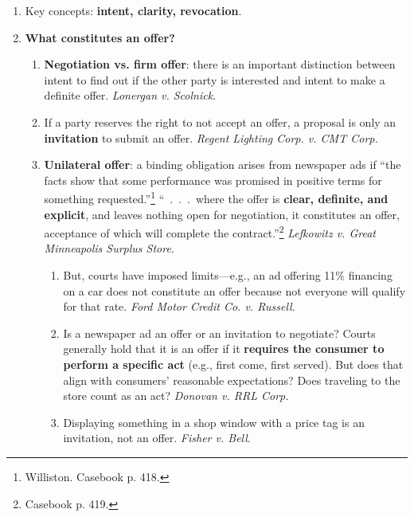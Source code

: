 \begin{enumerate}
    \item Key concepts: \textbf{intent, clarity, revocation}.
    \item \textbf{What constitutes an offer?}
    \begin{enumerate}
        \item \textbf{Negotiation vs. firm offer}: there is an important 
        distinction between intent to find out if the other party is 
        interested and intent to make a definite offer. \emph{Lonergan v. 
        Scolnick}.
        \item If a party reserves the right to not accept an offer, a proposal 
        is only an \textbf{invitation} to submit an offer. \emph{Regent 
        Lighting Corp. v. CMT Corp.}
        \item \textbf{Unilateral offer}: a binding obligation arises from 
        newspaper ads if ``the facts show that some performance was promised 
        in positive terms for something requested.''\footnote{Williston. 
        Casebook p.  418.} ``~.~.~.~where the offer is \textbf{clear, 
        definite, and explicit}, and leaves nothing open for negotiation, it 
        constitutes an offer, acceptance of which will complete the 
        contract.''\footnote{Casebook p.  419.} \emph{Lefkowitz v. Great 
        Minneapolis Surplus Store}.
        \begin{enumerate}
            \item But, courts have imposed limits---e.g., an ad offering 11\% 
            financing on a car does not constitute an offer because not 
            everyone will qualify for that rate. \emph{Ford Motor Credit Co. 
            v. Russell}.
            \item Is a newspaper ad an offer or an invitation to negotiate? 
            Courts generally hold that it is an offer if it \textbf{requires 
            the consumer to perform a specific act} (e.g., first come, first 
            served). But does that align with consumers' reasonable 
            expectations? Does traveling to the store count as an act? 
            \emph{Donovan v. RRL Corp.}
            \item Displaying something in a shop window with a price tag is an 
            invitation, not an offer. \emph{Fisher v. Bell}.
        \end{enumerate}

\end{enumerate}
\end{enumerate}
